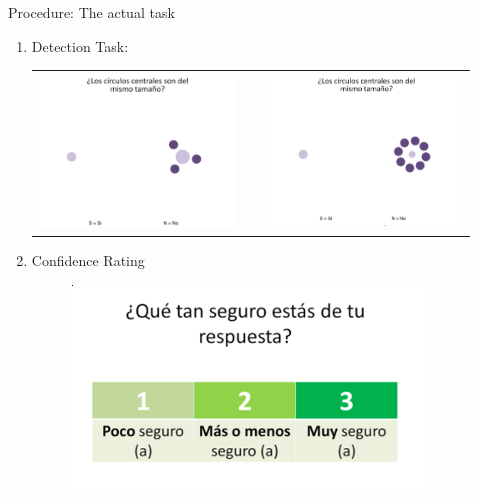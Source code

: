 \documentclass[final]{beamer}
\newlength{\sepwid}
\newlength{\onecolwid}
\newlength{\twocolwid}
\begin{document}
\begin{frame}[t]
\begin{columns}[t]
\begin{column}{\twocolwid}
\begin{columns}[t,totalwidth=\twocolwid]
\begin{column}{\onecolwid}
\begin{alertblock}{Procedure: The actual task}
\begin{enumerate}
\item Detection Task: 
\begin{center}
\begin{tabular}{ccc}
\includegraphics[width=0.45\linewidth]{Figures/MainTask.png} & \hfill & \includegraphics[width=0.4\linewidth]{Figures/MainTask2.png}
\end{tabular}
\end{center}
\item Confidence Rating
\begin{figure}
\includegraphics[width=0.5\linewidth]{Figures/ConfidenceTask.png}
\end{figure}
\end{enumerate}
\end{alertblock}
\end{column} %

\begin{column}{\sepwid}\end{column} %
\begin{column}{\twocolwid}\vspace{-2in} %


\end{column}
\end{columns}
\end{column}
\end{columns}
\end{frame}
\end{document}

